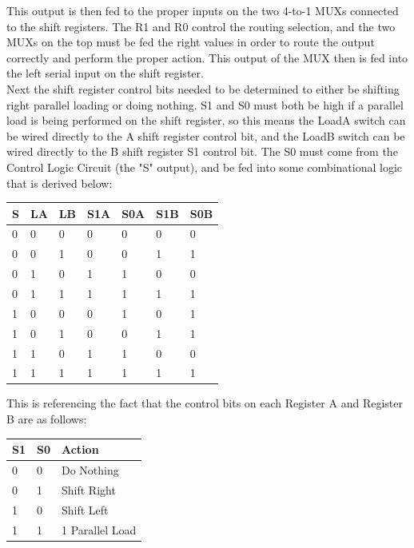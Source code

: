 \documentclass[journal, twocolumn, final,11pt,letterpaper]{IEEEtran}
\begin{document}
This output is then fed to the proper inputs on the two 4-to-1 MUXs connected to the shift registers. The R1 and R0 control the routing selection, and the two MUXs on the top must be fed the right values in order to route the output correctly and perform the proper action. This output of the MUX then is fed into the left serial input on the shift register. \\

Next the shift register control bits needed to be determined to either be shifting right parallel loading or doing nothing. S1 and S0 must both be high if a parallel load is being performed on the shift register, so this means the LoadA switch can be wired directly to the A shift register control bit, and the LoadB switch can be wired directly to the B shift register S1 control bit. The S0 must come from the Control Logic Circuit (the "S" output), and be fed into some combinational logic that is derived below:

\begin{center}
	\begin{tabular}{lll|ll|ll}
		S & LA & LB & S1A & S0A & S1B & S0B\\ \hline
		0 & 0 & 0 & 0 & 0 & 0 & 0 \\
		0 & 0 & 1 & 0 & 0 & 1 & 1 \\
		0 & 1 & 0 & 1 & 1 & 0 & 0 \\
		0 & 1 & 1 & 1 & 1 & 1 & 1 \\
		1 & 0 & 0 & 0 & 1 & 0 & 1 \\
		1 & 0 & 1 & 0 & 0 & 1 & 1 \\
		1 & 1 & 0 & 1 & 1 & 0 & 0 \\
		1 & 1 & 1 & 1 & 1 & 1 & 1 \\
	\end{tabular}
\end{center}

This is referencing the fact that the control bits on each Register A and Register B are as follows: 

\begin{center}
	\begin{tabular}{ll|l}
		S1 & S0 & Action \\ \hline
		0 & 0 & Do Nothing  \\
		0 & 1 & Shift Right \\
		1 & 0 & Shift Left \\
		1 & 1 & 1 Parallel Load\\
	\end{tabular}
\end{center}
\end{document}
